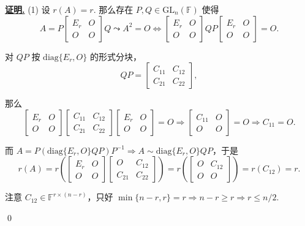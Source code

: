 \documentclass[10pt,openany]{article}
\theoremstyle{thmstyle} %
\theoremstyle{defstyle} %
\theoremstyle{prostyle} %
\theoremstyle{exastyle}
\theoremstyle{remstyle}
\renewenvironment{proof}[1][证明]{\par\underline{\textbf{#1.}} \;\fangsong}{\qed\par}
\newcommand{\F}{\mathbb{F}}
\newcommand{\gfn}{\text{GL}_n(\mathbb{F})}
\newcommand{\diag}{\mathrm{diag}}
\begin{document}
\begin{proof}
	(1) 设 \( r(A)=r \). 那么存在 \( P,Q \in \gfn \) 使得
	\[ A=P\begin{bmatrix}
		E_r & O \\
		O & O
	\end{bmatrix}Q \leadsto A^2=O \Leftrightarrow \begin{bmatrix}
	E_r & O \\
	O & O
	\end{bmatrix}QP\begin{bmatrix}
	E_r & O \\
	O & O
	\end{bmatrix}=O.\]
	
	对 \( QP \) 按 \( \diag\{E_r,O\} \) 的形式分块，
	\[ QP=\begin{bmatrix}
		C_{11} & C_{12} \\
		C_{21} & C_{22}
	\end{bmatrix}, \]
	
	那么
	\[ \begin{bmatrix}
		E_r & O \\
		O & O
	\end{bmatrix}\begin{bmatrix}
	C_{11} & C_{12} \\
	C_{21} & C_{22}
	\end{bmatrix}\begin{bmatrix}
		E_r & O \\
		O & O
	\end{bmatrix}=O \Rightarrow \begin{bmatrix}
	C_{11} & O \\
	O & O
	\end{bmatrix}=O \Rightarrow C_{11}=O. \]
	
	而 \( A =P(\diag\{E_r,O\}QP)P^{-1} \Rightarrow A \sim \diag\{E_r,O\}QP \)，于是
	\[ r(A)=r\left( \begin{bmatrix}
		E_r & O \\
		O & O
	\end{bmatrix}\begin{bmatrix}
	O & C_{12} \\
	C_{21} & C_{22}
	\end{bmatrix}\right)=r \left( \begin{bmatrix}
	O & C_{12} \\
	O & O
	\end{bmatrix} \right)=r(C_{12})=r. \]
	
	注意 \( C_{12} \in \F^{r \times (n-r)} \)，只好 \( \min\{n-r,r\}=r \Rightarrow n-r \geq r \Rightarrow r \leq n/2 \).
	

\end{proof}
\end{document}
